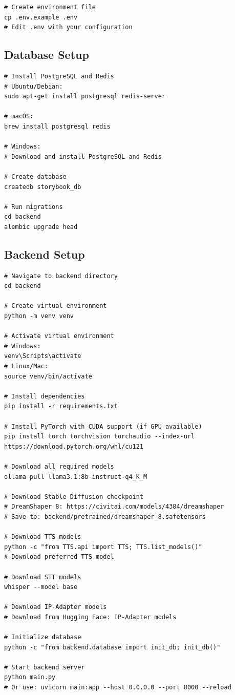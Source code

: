 {\begin{verbatim}
# Create environment file
cp .env.example .env
# Edit .env with your configuration
\end{verbatim}

\subsection{Database Setup}
\begin{verbatim}
# Install PostgreSQL and Redis
# Ubuntu/Debian:
sudo apt-get install postgresql redis-server

# macOS:
brew install postgresql redis

# Windows:
# Download and install PostgreSQL and Redis

# Create database
createdb storybook_db

# Run migrations
cd backend
alembic upgrade head
\end{verbatim}

\subsection{Backend Setup}
\begin{verbatim}
# Navigate to backend directory
cd backend

# Create virtual environment
python -m venv venv

# Activate virtual environment
# Windows:
venv\Scripts\activate
# Linux/Mac:
source venv/bin/activate

# Install dependencies
pip install -r requirements.txt

# Install PyTorch with CUDA support (if GPU available)
pip install torch torchvision torchaudio --index-url https://download.pytorch.org/whl/cu121

# Download all required models
ollama pull llama3.1:8b-instruct-q4_K_M

# Download Stable Diffusion checkpoint
# DreamShaper 8: https://civitai.com/models/4384/dreamshaper
# Save to: backend/pretrained/dreamshaper_8.safetensors

# Download TTS models
python -c "from TTS.api import TTS; TTS.list_models()"
# Download preferred TTS model

# Download STT models
whisper --model base

# Download IP-Adapter models
# Download from Hugging Face: IP-Adapter models

# Initialize database
python -c "from backend.database import init_db; init_db()"

# Start backend server
python main.py
# Or use: uvicorn main:app --host 0.0.0.0 --port 8000 --reload
\end{verbatim}

}

